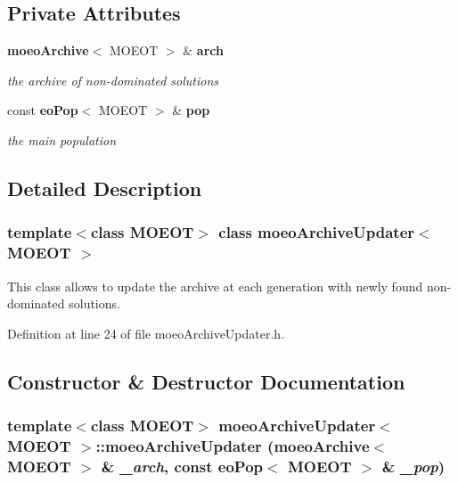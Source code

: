 \subsection*{Private Attributes}
\begin{CompactItemize}
\item 
{\bf moeo\-Archive}$<$ MOEOT $>$ \& {\bf arch}\label{classmoeoArchiveUpdater_64531e46898b0e2a4ec48ba28dbfd59d}

\begin{CompactList}\small\item\em the archive of non-dominated solutions \item\end{CompactList}\item 
const {\bf eo\-Pop}$<$ MOEOT $>$ \& {\bf pop}\label{classmoeoArchiveUpdater_a7ba8cde3727d1f24835083e85dfd70d}

\begin{CompactList}\small\item\em the main population \item\end{CompactList}\end{CompactItemize}


\subsection{Detailed Description}
\subsubsection*{template$<$class MOEOT$>$ class moeo\-Archive\-Updater$<$ MOEOT $>$}

This class allows to update the archive at each generation with newly found non-dominated solutions. 



Definition at line 24 of file moeo\-Archive\-Updater.h.

\subsection{Constructor \& Destructor Documentation}
\subsubsection{\setlength{\rightskip}{0pt plus 5cm}template$<$class MOEOT$>$ {\bf moeo\-Archive\-Updater}$<$ MOEOT $>$::{\bf moeo\-Archive\-Updater} ({\bf moeo\-Archive}$<$ MOEOT $>$ \& {\em \_\-arch}, const {\bf eo\-Pop}$<$ MOEOT $>$ \& {\em \_\-pop})\hspace{0.3cm}{\tt  [inline]}}\label{classmoeoArchiveUpdater_1497a2bc8df12565b3ea21bb8e08bee1}


